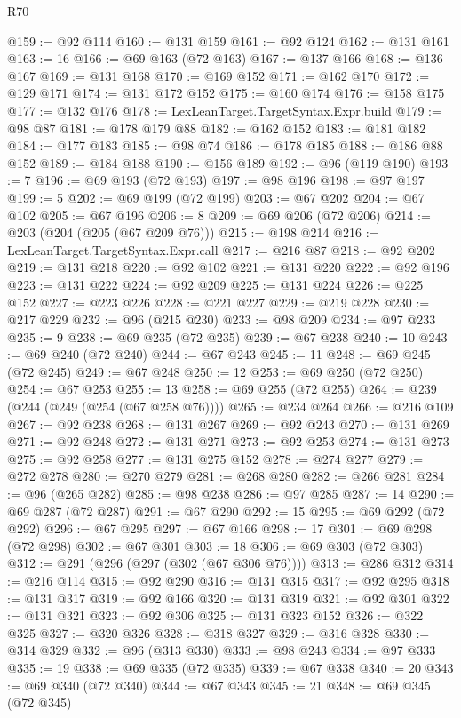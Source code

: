 \begin{lexlean}{R70}
\begin{coremodule}
@159 := @92 @114
@160 := @131 @159
@161 := @92 @124
@162 := @131 @161
@163 := 16
@166 := @69 @163 (@72 @163)
@167 := @137 @166
@168 := @136 @167
@169 := @131 @168
@170 := @169 @152
@171 := @162 @170
@172 := @129 @171
@174 := @131 @172 @152
@175 := @160 @174
@176 := @158 @175
@177 := @132 @176
@178 := LexLeanTarget.TargetSyntax.Expr.build
@179 := @98 @87
@181 := @178 @179 @88
@182 := @162 @152
@183 := @181 @182
@184 := @177 @183
@185 := @98 @74
@186 := @178 @185
@188 := @186 @88 @152
@189 := @184 @188
@190 := @156 @189
@192 := @96 (@119 @190)
@193 := 7
@196 := @69 @193 (@72 @193)
@197 := @98 @196
@198 := @97 @197
@199 := 5
@202 := @69 @199 (@72 @199)
@203 := @67 @202
@204 := @67 @102
@205 := @67 @196
@206 := 8
@209 := @69 @206 (@72 @206)
@214 := @203 (@204 (@205 (@67 @209 @76)))
@215 := @198 @214
@216 := LexLeanTarget.TargetSyntax.Expr.call
@217 := @216 @87
@218 := @92 @202
@219 := @131 @218
@220 := @92 @102
@221 := @131 @220
@222 := @92 @196
@223 := @131 @222
@224 := @92 @209
@225 := @131 @224
@226 := @225 @152
@227 := @223 @226
@228 := @221 @227
@229 := @219 @228
@230 := @217 @229
@232 := @96 (@215 @230)
@233 := @98 @209
@234 := @97 @233
@235 := 9
@238 := @69 @235 (@72 @235)
@239 := @67 @238
@240 := 10
@243 := @69 @240 (@72 @240)
@244 := @67 @243
@245 := 11
@248 := @69 @245 (@72 @245)
@249 := @67 @248
@250 := 12
@253 := @69 @250 (@72 @250)
@254 := @67 @253
@255 := 13
@258 := @69 @255 (@72 @255)
@264 := @239 (@244 (@249 (@254 (@67 @258 @76))))
@265 := @234 @264
@266 := @216 @109
@267 := @92 @238
@268 := @131 @267
@269 := @92 @243
@270 := @131 @269
@271 := @92 @248
@272 := @131 @271
@273 := @92 @253
@274 := @131 @273
@275 := @92 @258
@277 := @131 @275 @152
@278 := @274 @277
@279 := @272 @278
@280 := @270 @279
@281 := @268 @280
@282 := @266 @281
@284 := @96 (@265 @282)
@285 := @98 @238
@286 := @97 @285
@287 := 14
@290 := @69 @287 (@72 @287)
@291 := @67 @290
@292 := 15
@295 := @69 @292 (@72 @292)
@296 := @67 @295
@297 := @67 @166
@298 := 17
@301 := @69 @298 (@72 @298)
@302 := @67 @301
@303 := 18
@306 := @69 @303 (@72 @303)
@312 := @291 (@296 (@297 (@302 (@67 @306 @76))))
@313 := @286 @312
@314 := @216 @114
@315 := @92 @290
@316 := @131 @315
@317 := @92 @295
@318 := @131 @317
@319 := @92 @166
@320 := @131 @319
@321 := @92 @301
@322 := @131 @321
@323 := @92 @306
@325 := @131 @323 @152
@326 := @322 @325
@327 := @320 @326
@328 := @318 @327
@329 := @316 @328
@330 := @314 @329
@332 := @96 (@313 @330)
@333 := @98 @243
@334 := @97 @333
@335 := 19
@338 := @69 @335 (@72 @335)
@339 := @67 @338
@340 := 20
@343 := @69 @340 (@72 @340)
@344 := @67 @343
@345 := 21
@348 := @69 @345 (@72 @345)

\end{coremodule}
\end{lexlean}
